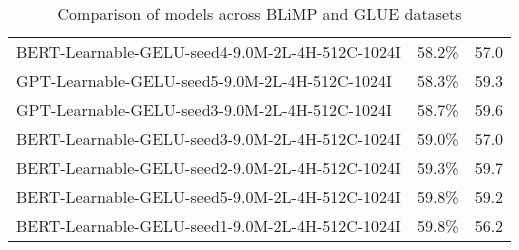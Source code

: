 \begin{table}[ht]
\begin{tabular}{lcc}
    BERT-Learnable-GELU-seed4-9.0M-2L-4H-512C-1024I & 58.2\% & 57.0 \\
    GPT-Learnable-GELU-seed5-9.0M-2L-4H-512C-1024I & 58.3\% & 59.3 \\
    GPT-Learnable-GELU-seed3-9.0M-2L-4H-512C-1024I & 58.7\% & 59.6 \\
    BERT-Learnable-GELU-seed3-9.0M-2L-4H-512C-1024I & 59.0\% & 57.0 \\
    BERT-Learnable-GELU-seed2-9.0M-2L-4H-512C-1024I & 59.3\% & 59.7 \\
    BERT-Learnable-GELU-seed5-9.0M-2L-4H-512C-1024I & 59.8\% & 59.2 \\
    BERT-Learnable-GELU-seed1-9.0M-2L-4H-512C-1024I & 59.8\% & 56.2 \\
    \hline
    \end{tabular}
    \caption{Comparison of models across BLiMP and GLUE datasets}
    \label{tab:comparison}
    \end{table}
